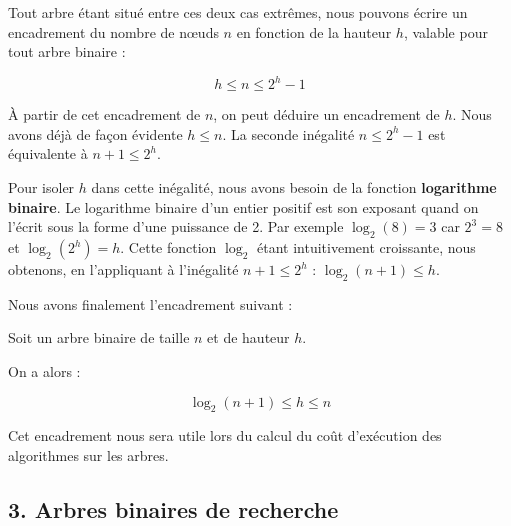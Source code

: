 \documentclass[
  a4paper,
  DIV=11,
  numbers=noendperiod]{scrartcl}
\begin{document}
Tout arbre étant situé entre ces deux cas extrêmes, nous pouvons écrire
un encadrement du nombre de nœuds \(n\) en fonction de la hauteur \(h\),
valable pour tout arbre binaire :

\[h\leqslant n\leqslant 2^h-1\]

À partir de cet encadrement de \(n\), on peut déduire un encadrement de
\(h\). Nous avons déjà de façon évidente \(h\leqslant n\). La seconde
inégalité \(n\leqslant 2^h-1\) est équivalente à \(n+1\leqslant 2^h\).

Pour isoler \(h\) dans cette inégalité, nous avons besoin de la fonction
\textbf{logarithme binaire}. Le logarithme binaire d'un entier positif
est son exposant quand on l'écrit sous la forme d'une puissance de 2.
Par exemple \(\log_2(8)=3\) car \(2^3=8\) et \(\log_2(2^h)=h\). Cette
fonction \(\log_2\) étant intuitivement croissante, nous obtenons, en
l'appliquant à l'inégalité \(n+1\leqslant 2^h\) :
\(\log_2(n+1)\leqslant h\).

Nous avons finalement l'encadrement suivant :

\begin{tcolorbox}[enhanced jigsaw, titlerule=0mm, opacityback=0, toptitle=1mm, opacitybacktitle=0.6, breakable, colback=white, title=\textcolor{quarto-callout-important-color}{\faExclamation}\hspace{0.5em}{Encadrement de la hauteur d'un arbre binaire}, bottomtitle=1mm, arc=.35mm, colbacktitle=quarto-callout-important-color!10!white, rightrule=.15mm, bottomrule=.15mm, leftrule=.75mm, toprule=.15mm, left=2mm, coltitle=black]

Soit un arbre binaire de taille \(n\) et de hauteur \(h\).

On a alors :

\[\log_2(n+1)\leqslant h\leqslant n\]

\end{tcolorbox}

Cet encadrement nous sera utile lors du calcul du coût d'exécution des
algorithmes sur les arbres.

\hypertarget{arbres-binaires-de-recherche}{%
\subsection{3. Arbres binaires de
recherche}\label{arbres-binaires-de-recherche}}
\end{document}
